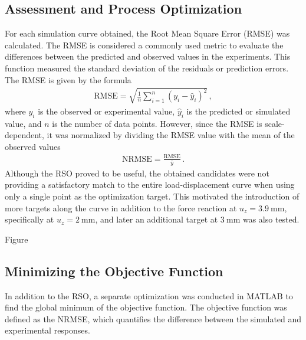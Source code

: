 \subsection*{Assessment and Process Optimization}
For each simulation curve obtained, the Root Mean Square Error (RMSE) was calculated.
The RMSE is considered a commonly used metric to evaluate the differences between the predicted and 
observed values in the experiments. This function measured the standard deviation of the residuals 
or prediction errors. The RMSE is given by the formula 
\begin{align}
	\text{RMSE} = \sqrt{\frac{1}{n}\sum_{i=1}^{n}(y_i - \hat{y}_i)^2}\, ,
\end{align}
where $y_i$ is the observed or experimental value, $\hat{y}_i$ is the predicted or simulated value, and 
$n$ is the number of data points. However, since the RMSE is scale-dependent, it was normalized by dividing the
RMSE value with the mean of the observed values%
\begin{align}
	\text{NRMSE} = \frac{\text{RMSE}}{\bar{y}} \, .
\end{align}
Although the RSO proved to be useful, the obtained candidates were not providing a satisfactory 
match to the entire load-displacement curve when using only a single point as the optimization target.
This motivated the introduction of more targets along the curve in addition to the force reaction at 
$u_z=\SI{3.9}{\milli\meter}$, specifically at $u_z=\SI{2}{\milli\meter}$, 
and later an additional target at $\SI{3}{\milli\meter}$ was also tested.

Figure%






\subsection{Minimizing the Objective Function}

In addition to the RSO, a separate optimization was conducted in MATLAB to find the global minimum of the objective function. The objective function was defined as the NRMSE, which quantifies the difference between the simulated and experimental responses.

